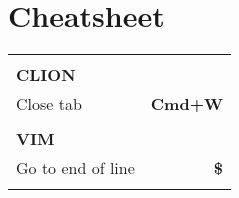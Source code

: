 \documentclass[9pt,a4paper,landscape,draft,sans]{scrartcl}
\makeatletter
\let\mcnewpage=\newpage
\newcommand{\TrickSupertabularIntoMulticols}{%
  \renewcommand\newpage{%
    \if@firstcolumn
      \hrule width\linewidth height0pt
      \columnbreak
    \else
      \mcnewpage
    \fi
  }%
}
\newcommand{\theader}[1]{
    \rule{0pt}{6ex} \\
    \textbf{\uppercase{#1}} & \\
    \noalign{\global\arrayrulewidth=1.5pt}
    \hline
}
\newcommand{\tshortcut}[2]{
    #1 & \textbf{#2} \\
    \noalign{\global\arrayrulewidth=0.5pt}
    \hline
}
\makeatother
\begin{document}
\section*{Cheatsheet}
\begin{multicols}{3}


\TrickSupertabularIntoMulticols
\begin{supertabular}{@{}p{5cm}r@{}}
    \theader{CLion}
    \tshortcut{Close tab}{Cmd+W}
    \theader{Vim}
    \tshortcut{Go to end of line                          }{\$}
\end{supertabular}

\end{multicols}
\end{document}
